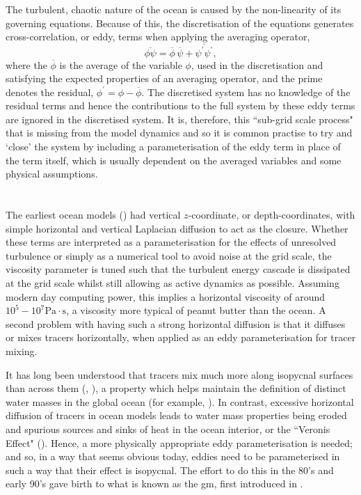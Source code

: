 \documentclass[12pt,a4paper]{report}
\newcommand*\mean[1]{\overline{#1}}
\newcommand*\res[1]{{#1}^{\prime}}
\begin{document}
 The turbulent, chaotic nature of the ocean is caused by the non-linearity of its 
 governing equations. Because of this,  the discretisation of the equations generates cross-correlation, or eddy, terms when applying the 
 averaging operator,
 \begin{equation}
 \mean{\phi\psi} = \mean{\phi}\,\mean{\psi} + 
 \mean{\res{\psi}\res{\psi}},
 \label{non-lin average}
 \end{equation}
 where the ${\mean{\phi}}$ is the average of the variable ${\phi}$, used in
 the discretisation and satisfying
 the expected properties of an averaging operator, and the prime denotes the residual, ${\phi^{\prime} = \phi - \mean{\phi}}$.
 The discretised system has no knowledge of the residual terms and hence
 the contributions to the full system by these eddy terms are
 ignored in the discretised system. It is, therefore, this ``sub-grid scale process"
 that is missing from the model dynamics and so it is common practise to try and
 `close' the system by including a parameterisation of the eddy
 term in place of the term itself, which is usually dependent on the averaged 
 variables and some physical assumptions.
 
 \section{\cite{gent1990}}
 
 The earliest ocean models (\cite{bryan1969numerical}) had vertical $z$-coordinate, or depth-coordinates, with simple horizontal and vertical Laplacian diffusion to act as 
 the closure. Whether these terms are interpreted as a parameterisation for the effects
 of unresolved turbulence or simply as a numerical tool to avoid noise at 
 the grid scale, the viscosity parameter is tuned such that the turbulent energy cascade is 
 dissipated at the grid scale whilst still allowing as active dynamics as possible. 
 Assuming modern day computing power, this implies a horizontal viscosity of around 
 $10^{5} - 10^{7} \mathrm{Pa} \cdot \mathrm{s}$, a viscosity more typical of peanut butter than 
 the ocean. A second problem with having such a strong horizontal diffusion is
 that it diffuses or mixes tracers horizontally, when applied as
 an eddy parameterisation for tracer mixing. 
 
 It has long been understood that tracers 
 mix much more along isopycnal surfaces than across them (\cite{iselin1939influence}, \cite{montgomery1940present}),  a property which helps maintain the definition of
 distinct water masses in the global ocean (for example, \cite{emery1986global}).
  In contrast, excessive horizontal diffusion
 of tracers in ocean models leads to water mass properties
 being eroded and spurious sources and sinks of heat in the 
 ocean interior, or the ``Veronis Effect" (\cite{veronis1975role}).
 Hence, a more physically appropriate eddy parameterisation 
 is needed;
  and so, in a way that seems obvious today, eddies need to be
   parameterised in 
 such a way that their effect is isopycnal. 
 The effort to do this in the 80's and early 90's gave birth
 to what is known as the \gls{gm}, first introduced in \cite{gent1990}.
 
\end{document}
